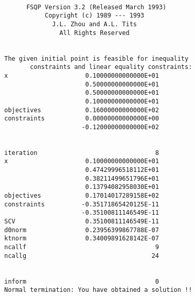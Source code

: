 \begin{verbatim}

                    FSQP Version 3.2 (Released March 1993)    
                         Copyright (c) 1989 --- 1993          
                           J.L. Zhou and A.L. Tits    
                             All Rights Reserved              
             
                          
              The given initial point is feasible for inequality
                     constraints and linear equality constraints:
              x                     0.10000000000000E+01
                                    0.50000000000000E+01
                                    0.50000000000000E+01
                                    0.10000000000000E+01
              objectives            0.16000000000000E+02
              constraints           0.00000000000000E+00
                                   -0.12000000000000E+02
             
             
              iteration                                8
              x                     0.10000000000000E+01
                                    0.47429996518112E+01
                                    0.38211499651796E+01
                                    0.13794082958030E+01
              objectives            0.17014017289158E+02
              constraints          -0.35171865420125E-11
                                   -0.35100811146549E-11
              SCV                   0.35100811146549E-11
              d0norm                0.23956399867788E-07
              ktnorm                0.34009891628142E-07
              ncallf                                   9
              ncallg                                  24


              inform                                   0
              Normal termination: You have obtained a solution !!
\end{verbatim}

